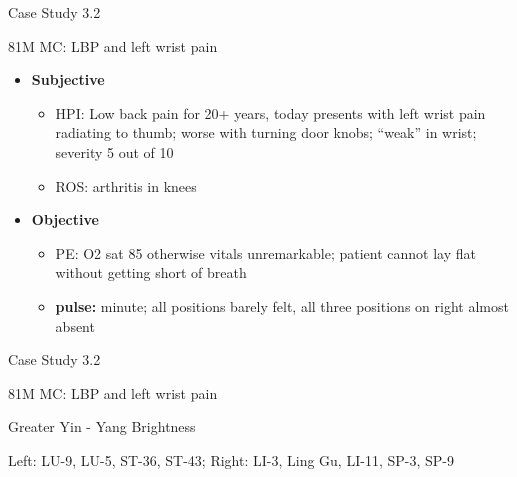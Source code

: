 \begin{frame}{Case Study 3.2}

81M MC: LBP and left wrist pain

\begin{itemize}
\item \textbf{Subjective}
\begin{itemize}
\item HPI: Low back pain for 20+ years, today presents with left wrist pain radiating to thumb; worse with turning door knobs; ``weak'' in wrist; severity 5 out of 10
\item ROS: arthritis in knees
\end{itemize}
\item \textbf{Objective}
\begin{itemize}
\item PE: O2 sat 85 otherwise vitals unremarkable; patient cannot lay flat without getting short of breath
\item \textbf{pulse:} minute; all positions barely felt, all three positions on right almost absent
\end{itemize}
\end{itemize}

\end{frame}

\begin{frame}{Case Study 3.2}

81M MC: LBP and left wrist pain  

\begin{as}
Greater Yin - Yang Brightness
\end{as}

\vspace{1em}

\begin{pln}
Left: LU-9, LU-5, ST-36, ST-43; Right: LI-3, Ling Gu, LI-11, SP-3, SP-9
\end{pln}

\end{frame}

